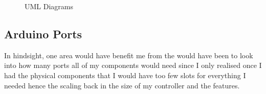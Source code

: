 \documentclass{article}
\begin{document}
\begin{figure}[ht]%
    \centering
    \qquad
    \qquad
    \caption{UML Diagrams}%
    \label{fig:uml-diagrams}%
\end{figure}

\subsection{Arduino Ports}
In hindsight, one area would have benefit me from the would have been to look into how many ports all of my components would need since I only realised once I had the physical components that I would have too few slots for everything I needed hence the scaling back in the size of my controller and the features.
\\
\end{document}

